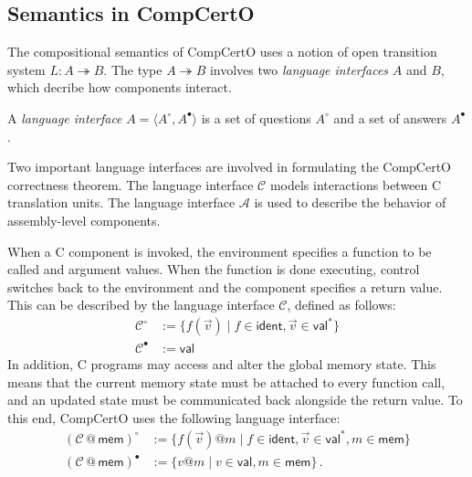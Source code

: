 \documentclass[acmsmall,screen,review,anonymous]{acmart}
\newcommand{\kw}[1]{\ensuremath{ \mathsf{#1} }}
\newcommand{\que}{\circ}
\newcommand{\ans}{\bullet}
\begin{document}
\subsection{Semantics in CompCertO} %


The compositional semantics of CompCertO uses %
a notion of open transition system $L : A \twoheadrightarrow B$.
The type $A \twoheadrightarrow B$ involves
two \emph{language interfaces} $A$ and $B$,
which decribe how components interact.

\begin{definition} \label{def:li} %
A \emph{language interface} $A = \langle A^\que, A^\ans \rangle$
is a set of questions $A^\que$ and a set of answers $A^\ans$.
\end{definition}

Two important language interfaces
are involved in formulating the CompCertO correctness theorem.
The language interface $\mathcal{C}$
models interactions between C translation units.
The language interface $\mathcal{A}$
is used to describe the behavior of assembly-level components.

\begin{example} \label{ex:langint} %
When a C component is invoked,
the environment specifies a function to be called
and argument values.
When the function is done executing,
control switches back to the environment
and the component specifies a return value.
This can be described by the language interface $\mathcal{C}$,
defined as follows:
\begin{align*}
  \mathcal{C}^\que &:= \{ f(\vec{v}) \mid f \in \kw{ident}, \vec{v} \in \kw{val}^* \}
  \\
  \mathcal{C}^\ans &:= \kw{val}
\end{align*}
In addition,
C programs may access and alter the global memory state.
This means that the current memory state must be attached
to every function call,
and an updated state must be communicated back
alongside the return value.
To this end, CompCertO uses the following language interface:
\begin{align*}
  (\mathcal{C} \mathbin@ \kw{mem})^\que &:=
    \{ f(\vec{v})@m \mid f \in \kw{ident}, \vec{v} \in \kw{val}^*, m \in \kw{mem} \}
  \\
  (\mathcal{C} \mathbin@ \kw{mem})^\ans &:=
    \{ v@m \mid v \in \kw{val}, m \in \kw{mem} \}
  \,.
\end{align*}
\end{example}
\end{document}
